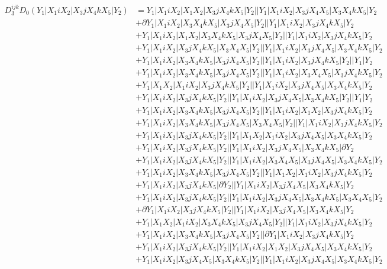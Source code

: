 \documentclass{article}[12pt]
\begin{document}
\begin{align*}
D_3^{ijk}D_0(Y_1|X_1iX_2|X_3jX_4kX_5|Y_2)& =Y_1|X_1iX_2|X_1X_2|X_3jX_4kX_5|Y_2||Y_1|X_1iX_2|X_3jX_4X_5|X_3X_4kX_5|Y_2\\ 
 & +\partial Y_1|X_1iX_2|X_3X_4kX_5|X_3jX_4X_5|Y_2||Y_1|X_1iX_2|X_3jX_4kX_5|Y_2\\ 
 & +Y_1|X_1iX_2|X_1X_2|X_3X_4kX_5|X_3jX_4X_5|Y_2||Y_1|X_1iX_2|X_3jX_4kX_5|Y_2\\ 
 & +Y_1|X_1iX_2|X_3jX_4kX_5|X_3X_4X_5|Y_2||Y_1|X_1iX_2|X_3jX_4X_5|X_3X_4kX_5|Y_2\\ 
 & +Y_1|X_1iX_2|X_3X_4kX_5|X_3jX_4X_5|Y_2||Y_1|X_1iX_2|X_3jX_4kX_5|Y_2||Y_1|Y_2\\ 
 & +Y_1|X_1iX_2|X_3X_4kX_5|X_3jX_4X_5|Y_2||Y_1|X_1iX_2|X_3X_4X_5|X_3jX_4kX_5|Y_2\\ 
 & +Y_1|X_1X_2|X_1iX_2|X_3jX_4kX_5|Y_2||Y_1|X_1iX_2|X_3jX_4X_5|X_3X_4kX_5|Y_2\\ 
 & +Y_1|X_1iX_2|X_3jX_4kX_5|Y_2||Y_1|X_1iX_2|X_3jX_4X_5|X_3X_4kX_5|Y_2||Y_1|Y_2\\ 
 & +Y_1|X_1iX_2|X_3X_4kX_5|X_3jX_4X_5|Y_2||Y_1|X_1iX_2|X_1X_2|X_3jX_4kX_5|Y_2\\ 
 & +Y_1|X_1iX_2|X_3X_4kX_5|X_3jX_4X_5|X_3X_4X_5|Y_2||Y_1|X_1iX_2|X_3jX_4kX_5|Y_2\\ 
 & +Y_1|X_1iX_2|X_3jX_4kX_5|Y_2||Y_1|X_1X_2|X_1iX_2|X_3jX_4X_5|X_3X_4kX_5|Y_2\\ 
 & +Y_1|X_1iX_2|X_3jX_4kX_5|Y_2||Y_1|X_1iX_2|X_3jX_4X_5|X_3X_4kX_5|\partial Y_2\\ 
 & +Y_1|X_1iX_2|X_3jX_4kX_5|Y_2||Y_1|X_1iX_2|X_3X_4X_5|X_3jX_4X_5|X_3X_4kX_5|Y_2\\ 
 & +Y_1|X_1iX_2|X_3X_4kX_5|X_3jX_4X_5|Y_2||Y_1|X_1X_2|X_1iX_2|X_3jX_4kX_5|Y_2\\ 
 & +Y_1|X_1iX_2|X_3jX_4kX_5|\partial Y_2||Y_1|X_1iX_2|X_3jX_4X_5|X_3X_4kX_5|Y_2\\ 
 & +Y_1|X_1iX_2|X_3jX_4kX_5|Y_2||Y_1|X_1iX_2|X_3jX_4X_5|X_3X_4kX_5|X_3X_4X_5|Y_2\\ 
 & +\partial Y_1|X_1iX_2|X_3jX_4kX_5|Y_2||Y_1|X_1iX_2|X_3jX_4X_5|X_3X_4kX_5|Y_2\\ 
 & +Y_1|X_1X_2|X_1iX_2|X_3X_4kX_5|X_3jX_4X_5|Y_2||Y_1|X_1iX_2|X_3jX_4kX_5|Y_2\\ 
 & +Y_1|X_1iX_2|X_3X_4kX_5|X_3jX_4X_5|Y_2||\partial Y_1|X_1iX_2|X_3jX_4kX_5|Y_2\\ 
 & +Y_1|X_1iX_2|X_3jX_4kX_5|Y_2||Y_1|X_1iX_2|X_1X_2|X_3jX_4X_5|X_3X_4kX_5|Y_2\\ 
 & +Y_1|X_1iX_2|X_3jX_4X_5|X_3X_4kX_5|Y_2||Y_1|X_1iX_2|X_3jX_4X_5|X_3X_4kX_5|Y_2\\ 

\end{align*}
\end{document}
